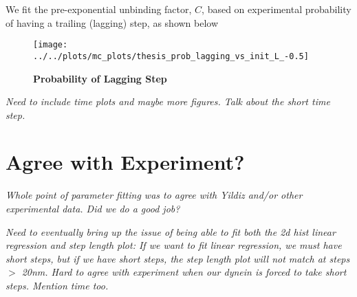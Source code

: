 We fit the pre-exponential unbinding factor, $C$, based on experimental probability of having a trailing (lagging) step, as shown below 

\begin{figure}[H]
	\centering
	\texttt{[image: ../../plots/mc\_plots/thesis\_prob\_lagging\_vs\_init\_L\_-0.5]}
	\caption[Probability of Lagging Step]{\textbf{Probability of Lagging Step}}
	\label{fig:ProbTrail}
\end{figure}

\textit{Need to include time plots and maybe more figures. Talk about the short time step.}

\section{Agree with Experiment?}
\textit{Whole point of parameter fitting was to agree with Yildiz and/or other experimental data. Did we do a good job? }

\textit{Need to eventually bring up the issue of being able to fit both the 2d hist linear regression and step length plot: If we want to fit linear regression, we must have short steps, but if we have short steps, the step length plot will not match at steps $>$ 20nm. Hard to agree with experiment when our dynein is forced to take short steps. Mention time too.}